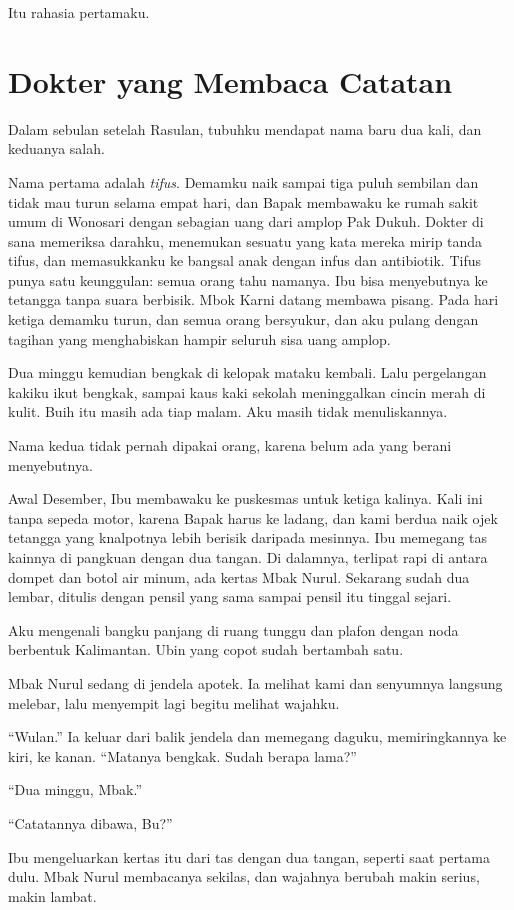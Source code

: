\documentclass[11pt,twoside,openany]{book}
\makeatletter
\newcommand{\scenebreak}{\par\vspace{0.9em}{\centering\textsc{*\hspace{0.7em}*\hspace{0.7em}*}\par}\vspace{0.9em}\@afterindentfalse\@afterheading}
\makeatother
\begin{document}
Itu rahasia pertamaku.

\chapter{Dokter yang Membaca Catatan}
Dalam sebulan setelah Rasulan, tubuhku mendapat nama baru dua kali, dan keduanya salah.

Nama pertama adalah \emph{tifus}. Demamku naik sampai tiga puluh sembilan dan tidak mau turun selama empat hari, dan Bapak membawaku ke rumah sakit umum di Wonosari dengan sebagian uang dari amplop Pak Dukuh. Dokter di sana memeriksa darahku, menemukan sesuatu yang kata mereka mirip tanda tifus, dan memasukkanku ke bangsal anak dengan infus dan antibiotik. Tifus punya satu keunggulan: semua orang tahu namanya. Ibu bisa menyebutnya ke tetangga tanpa suara berbisik. Mbok Karni datang membawa pisang. Pada hari ketiga demamku turun, dan semua orang bersyukur, dan aku pulang dengan tagihan yang menghabiskan hampir seluruh sisa uang amplop.

Dua minggu kemudian bengkak di kelopak mataku kembali. Lalu pergelangan kakiku ikut bengkak, sampai kaus kaki sekolah meninggalkan cincin merah di kulit. Buih itu masih ada tiap malam. Aku masih tidak menuliskannya.

Nama kedua tidak pernah dipakai orang, karena belum ada yang berani menyebutnya.

\scenebreak
Awal Desember, Ibu membawaku ke puskesmas untuk ketiga kalinya. Kali ini tanpa sepeda motor, karena Bapak harus ke ladang, dan kami berdua naik ojek tetangga yang knalpotnya lebih berisik daripada mesinnya. Ibu memegang tas kainnya di pangkuan dengan dua tangan. Di dalamnya, terlipat rapi di antara dompet dan botol air minum, ada kertas Mbak Nurul. Sekarang sudah dua lembar, ditulis dengan pensil yang sama sampai pensil itu tinggal sejari.

Aku mengenali bangku panjang di ruang tunggu dan plafon dengan noda berbentuk Kalimantan. Ubin yang copot sudah bertambah satu.

Mbak Nurul sedang di jendela apotek. Ia melihat kami dan senyumnya langsung melebar, lalu menyempit lagi begitu melihat wajahku.

``Wulan.'' Ia keluar dari balik jendela dan memegang daguku, memiringkannya ke kiri, ke kanan. ``Matanya bengkak. Sudah berapa lama?''

``Dua minggu, Mbak.''

``Catatannya dibawa, Bu?''

Ibu mengeluarkan kertas itu dari tas dengan dua tangan, seperti saat pertama dulu. Mbak Nurul membacanya sekilas, dan wajahnya berubah makin serius, makin lambat.
\end{document}
